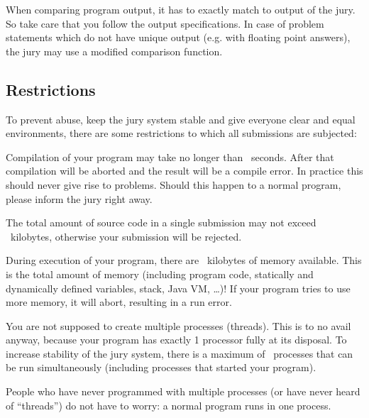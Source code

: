 When comparing program output, it has to exactly match to output of
the jury. So take care that you follow the output specifications. In
case of problem statements which do not have unique output (e.g. with
floating point answers), the jury may use a modified comparison
function.

\subsection{Restrictions}\label{runlimits}

To prevent abuse, keep the jury system stable and give everyone
clear and equal environments, there are some restrictions to which all
submissions are subjected:

\begin{description}
\item[compile time]
Compilation of your program may take no longer than \COMPILETIME\
seconds. After that compilation will be aborted and the result will
be a compile error. In practice this should never give rise to
problems. Should this happen to a normal program, please inform the
jury right away.

\item[source size]
The total amount of source code in a single submission may not exceed
\SOURCESIZE\ kilobytes, otherwise your submission will be rejected.

\item[memory]
During execution of your program, there are \MEMLIMIT\ kilobytes of
memory available. This is the total amount of memory (including
program code, statically and dynamically defined variables, stack,
Java VM, \dots)! If your program tries to use more memory, it will
abort, resulting in a run error.

\item[number of processes]
You are not supposed to create multiple processes (threads). This is
to no avail anyway, because your program has exactly 1 processor fully
at its disposal. To increase stability of the jury system, there is a
maximum of \PROCLIMIT\ processes that can be run simultaneously
(including processes that started your program).

People who have never programmed with multiple processes (or have
never heard of ``threads'') do not have to worry: a normal program
runs in one process.

\end{description}

